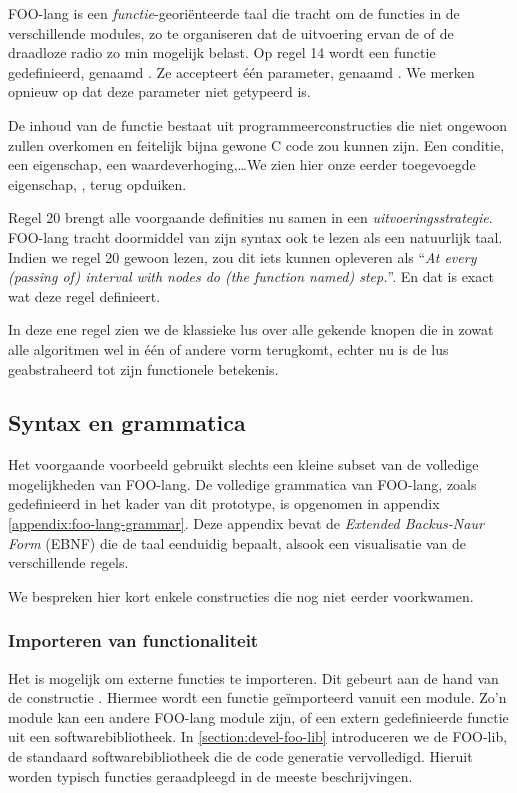 FOO-lang is een \emph{functie}-geori\"enteerde taal die tracht om de functies
in de verschillende modules, zo te organiseren dat de uitvoering ervan de \mcu
of de draadloze radio zo min mogelijk belast. Op regel 14 wordt een functie
gedefinieerd, genaamd . Ze accepteert \'e\'en parameter, genaamd
. We merken opnieuw op dat deze parameter niet getypeerd is.

De inhoud van de functie bestaat uit programmeerconstructies die niet ongewoon
zullen overkomen en feitelijk bijna gewone C code zou kunnen zijn. Een
conditie, een eigenschap, een waardeverhoging,\dots We zien hier onze eerder
toegevoegde eigenschap, , terug opduiken.

Regel 20 brengt alle voorgaande definities nu samen in een
\emph{uitvoeringsstrategie}. FOO-lang tracht doormiddel van zijn syntax ook te
lezen als een natuurlijk taal. Indien we regel 20 gewoon lezen, zou dit iets
kunnen opleveren als ``\emph{At every (passing of) interval with nodes do (the
function named) step.}''. En dat is exact wat deze regel definieert.

In deze ene regel zien we de klassieke lus over alle gekende knopen die in
zowat alle algoritmen wel in \'e\'en of andere vorm terugkomt, echter nu is de
lus geabstraheerd tot zijn functionele betekenis.

\subsection{Syntax en grammatica}
\label{subsection:devel-foo-lang-grammar}

Het voorgaande voorbeeld gebruikt slechts een kleine subset van de volledige
mogelijkheden van FOO-lang. De volledige grammatica van FOO-lang, zoals
gedefinieerd in het kader van dit prototype, is opgenomen in appendix
\ref{appendix:foo-lang-grammar}. Deze appendix bevat de \emph{Extended
Backus-Naur Form} (EBNF) die de taal eenduidig bepaalt, alsook een visualisatie
van de verschillende regels.

We bespreken hier kort enkele constructies die nog niet eerder voorkwamen.

\subsubsection{Importeren van functionaliteit}

Het is mogelijk om externe functies te importeren. Dit gebeurt aan de hand van
de constructie . Hiermee wordt een functie
ge\"importeerd vanuit een module. Zo'n module kan een andere FOO-lang module
zijn, of een extern gedefinieerde functie uit een softwarebibliotheek. In
\ref{section:devel-foo-lib} introduceren we de FOO-lib, de standaard
softwarebibliotheek die de code generatie vervolledigd. Hieruit worden typisch
functies geraadpleegd in de meeste beschrijvingen.


